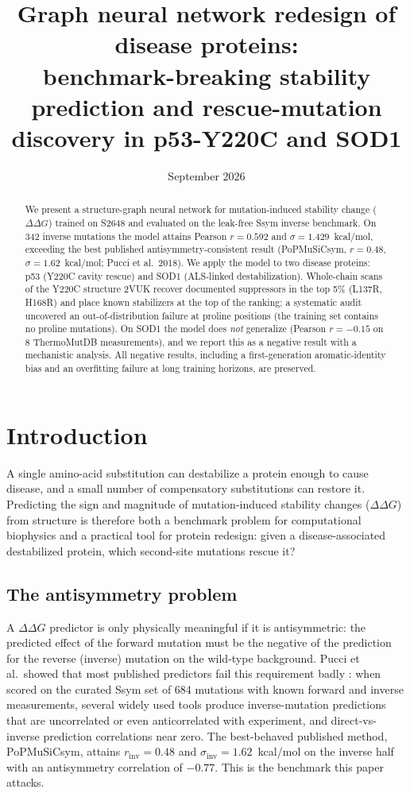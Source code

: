 \documentclass[11pt]{article}
\title{Graph neural network redesign of disease proteins:\\
benchmark-breaking stability prediction and rescue-mutation\\
discovery in p53-Y220C and SOD1}
\author{}
\date{September 2026}
\begin{document}
\maketitle
\begin{abstract}
We present a structure-graph neural network for mutation-induced
stability change ($\Delta\Delta G$) trained on S2648 and evaluated on the
leak-free Ssym inverse benchmark. On 342 inverse mutations the model
attains Pearson $r=0.592$ and $\sigma=1.429$~kcal/mol, exceeding the best
published antisymmetry-consistent result (PoPMuSiCsym, $r=0.48$,
$\sigma=1.62$~kcal/mol; Pucci et al.\ 2018). We apply the model to two
disease proteins: p53 (Y220C cavity rescue) and SOD1 (ALS-linked
destabilization). Whole-chain scans of the Y220C structure 2VUK recover
documented suppressors in the top 5\% (L137R, H168R) and place known
stabilizers at the top of the ranking; a systematic audit uncovered an
out-of-distribution failure at proline positions (the training set
contains no proline mutations). On SOD1 the model does \emph{not}
generalize (Pearson $r=-0.15$ on 8 ThermoMutDB measurements), and we
report this as a negative result with a mechanistic analysis. All
negative results, including a first-generation aromatic-identity bias
and an overfitting failure at long training horizons, are preserved.
\end{abstract}

\section{Introduction}
A single amino-acid substitution can destabilize a protein enough to
cause disease, and a small number of compensatory substitutions can
restore it. Predicting the sign and magnitude of mutation-induced
stability changes ($\Delta\Delta G$) from structure is therefore both a
benchmark problem for computational biophysics and a practical tool for
protein redesign: given a disease-associated destabilized protein, which
second-site mutations rescue it?

\subsection{The antisymmetry problem}
A $\Delta\Delta G$ predictor is only physically meaningful if it is
antisymmetric: the predicted effect of the forward mutation must be the
negative of the prediction for the reverse (inverse) mutation on the
wild-type background. Pucci et al.\ showed that most published predictors
fail this requirement badly \cite{pucci2018}: when scored on the
curated Ssym set of 684 mutations with known forward and inverse
measurements, several widely used tools produce inverse-mutation
predictions that are uncorrelated or even anticorrelated with experiment,
and direct-vs-inverse prediction correlations near zero. The
best-behaved published method, PoPMuSiCsym, attains
$r_{\mathrm{inv}}=0.48$ and $\sigma_{\mathrm{inv}}=1.62$~kcal/mol on the
inverse half with an antisymmetry correlation of $-0.77$. This is the
benchmark this paper attacks.
\end{document}
